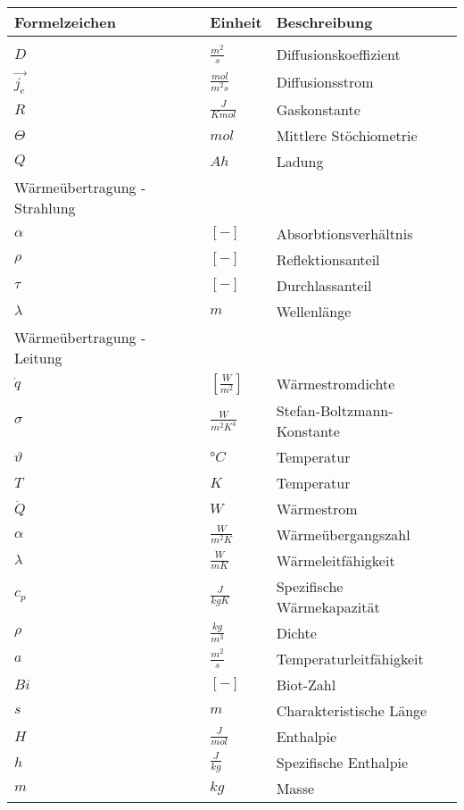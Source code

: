 \hspace{0.7cm}
\begin{tabularx}{15.1cm}{llX}
	\textbf{Formelzeichen} & \textbf{Einheit} & \textbf{Beschreibung} \\
	\hline \\ [-0.2cm]
	$D$ & $\frac{m^{2}}{s}$ & Diffusionskoeffizient\\ [0.1cm]
	$\vec{j_{e}}$ & $\frac{mol}{m^{2}s}$ & Diffusionsstrom\\ [0.1cm]
	$R$ & $\frac{J}{Kmol}$ & Gaskonstante\\ [0.1cm]
	$\Theta$ & $mol$ & Mittlere Stöchiometrie\\ [0.1cm]
	$Q$ & $Ah$ & Ladung\\ [0.1cm]
	\hline
	Wärmeübertragung - Strahlung &  & \\ [0.1cm]
	\hline
	$\alpha$ & $[-]$ & Absorbtionsverhältnis\\ [0.1cm]
	$\rho$ & $[-]$ & Reflektionsanteil\\ [0.1cm]
	$\tau$ & $[-]$ & Durchlassanteil\\ [0.1cm]
	$\lambda$ & $m$ & Wellenlänge\\ [0.1cm]
	\hline
	Wärmeübertragung - Leitung & & \\ [0.1cm] 
	\hline
	$\dot{q}$ & $[\frac{W}{m^{2}}]$ & Wärmestromdichte\\ [0.1cm]
	$\sigma$ & $\frac{W}{m^{2} K^{4}}$ & Stefan-Boltzmann-Konstante\\ [0.1cm]
	$\vartheta$ & $°C$ & Temperatur\\ [0.1cm]
	$T$ & $K$ & Temperatur\\ [0.1cm]
	$\dot{Q}$ & $W$ & Wärmestrom\\ [0.1cm]
	$\alpha$ & $\frac{W}{m^{2} K}$ & Wärmeübergangszahl\\ [0.1cm]
	$\lambda$ & $\frac{W}{mK}$ & Wärmeleitfähigkeit\\ [0.1cm]
	$c_{p}$ & $\frac{J}{kgK}$ & Spezifische Wärmekapazität\\ [0.1cm]
	$\rho$ & $\frac{kg}{m^{3}}$ & Dichte\\ [0.1cm]
	$a$ & $\frac{m^{2}}{s}$ & Temperaturleitfähigkeit\\ [0.1cm]
	$Bi$ & $[-]$ & Biot-Zahl\\ [0.1cm]
	$s$ & $m$ & Charakteristische Länge\\ [0.1cm]
	$H$ & $\frac{J}{mol}$ & Enthalpie\\ [0.1cm]
	$h$ & $\frac{J}{kg}$ & Spezifische Enthalpie\\ [0.1cm]
	$m$ & $kg$ & Masse\\ [0.1cm]
	
\end{tabularx}
